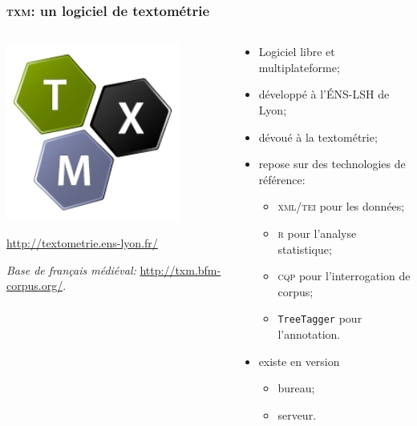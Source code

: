 \documentclass{beamer}
\begin{document}
\begin{frame}[fragile]
\frametitle{\textsc{txm}: un logiciel de textométrie}


\begin{columns}
	\begin{column}{0.30\textwidth}
	\begin{center}
	\includegraphics[width= 0.8\textwidth]{img/txm.png}
	\end{center}

\url{http://textometrie.ens-lyon.fr/}

\textit{Base de français médiéval:} \url{http://txm.bfm-corpus.org/}.
	\end{column}
	\begin{column}{0.66\textwidth}
		\begin{itemize}
			\item Logiciel libre et multiplateforme;
			\item développé à l'ÉNS-LSH de Lyon;
			\item dévoué à la textométrie;
			\item repose sur des technologies de référence:
				\begin{itemize}
					\item \textsc{xml/tei} pour les données;
					\item \textsc{r} pour l'analyse statistique;
					\item \textsc{cqp} pour l'interrogation de corpus;
					\item \texttt{TreeTagger} pour l'annotation.
				\end{itemize}
			\item existe en version
				\begin{itemize}
					\item bureau;
					\item serveur.
				\end{itemize}
		\end{itemize}
	\end{column}
\end{columns}
\end{frame}
\end{document}
